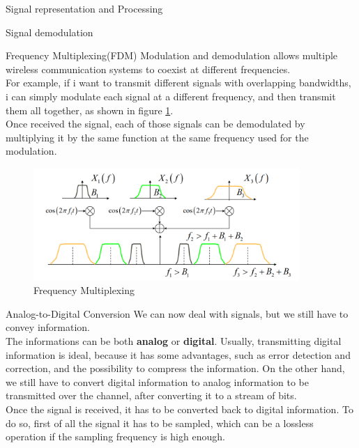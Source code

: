 \begin{section}{Signal representation and Processing}
\begin{subsection}{Signal demodulation}
    \end{subsection}
    \begin{subsection}{Frequency Multiplexing(FDM)}
      Modulation and demodulation allows multiple wireless communication systems to coexist at different
      frequencies.\\
      For example, if i want to transmit different signals with overlapping bandwidths, i can simply
      modulate each signal at a different frequency, and then transmit them all together, as shown in
      figure \ref{fig:FDM}.\\
      Once received the signal, each of those signals can be demodulated by multiplying it by the 
      same function at the same frequency used for the modulation.\\
      \begin{figure}[h]
        \centering
        \includegraphics[width=0.9\textwidth]{img/FDM.png}
        \caption{Frequency Multiplexing}
        \label{fig:FDM}
      \end{figure}
    \end{subsection}
    \begin{subsection}{Analog-to-Digital Conversion}
      We can now deal with signals, but we still have to convey information.\\
      The informations can be both \textbf{analog} or \textbf{digital}. Usually, transmitting digital
      information is ideal, because it has some advantages, such as error detection and correction,
      and the possibility to compress the information. On the other hand, we still have to convert
      digital information to analog information to be transmitted over the channel, after converting
      it to a stream of bits.\\
      Once the signal is received, it has to be converted back to digital information. To do so,
      first of all the signal it has to be sampled, which can be a lossless operation if the sampling
      frequency is high enough.\\

\end{subsection}
\end{section}
